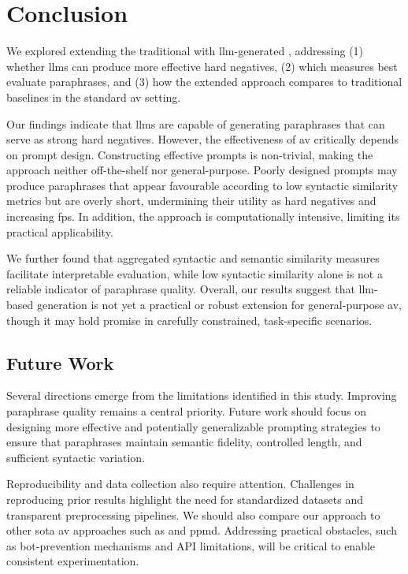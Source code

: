 \chapter{Conclusion}
\label{chap:conclusion}

We explored extending the traditional \impAppr{} with \ac{llm}-generated \imps{}, addressing (1) whether \acp{llm} can produce more effective hard negatives, (2) which measures best evaluate paraphrases, and (3) how the extended approach compares to traditional baselines in the standard \ac{av} setting.

Our findings indicate that \acp{llm} are capable of generating paraphrases that can serve as strong hard negatives. 
However, the effectiveness of \ac{av} critically depends on prompt design. 
Constructing effective prompts is non-trivial, making the approach neither off-the-shelf nor general-purpose. 
Poorly designed prompts may produce paraphrases that appear favourable according to low syntactic similarity metrics but are overly short, undermining their utility as hard negatives and increasing \acp{fp}. 
In addition, the approach is computationally intensive, limiting its practical applicability.  

We further found that aggregated syntactic and semantic similarity measures facilitate interpretable evaluation, while low syntactic similarity alone is not a reliable indicator of paraphrase quality. 
Overall, our results suggest that \ac{llm}-based \imp{} generation is not yet a practical or robust extension for general-purpose \ac{av}, though it may hold promise in carefully constrained, task-specific scenarios.  



\section{Future Work}

Several directions emerge from the limitations identified in this study. 
Improving paraphrase quality remains a central priority. 
Future work should focus on designing more effective and potentially generalizable prompting strategies to ensure that paraphrases maintain semantic fidelity, controlled length, and sufficient syntactic variation.  

Reproducibility and data collection also require attention. 
Challenges in reproducing prior results highlight the need for standardized datasets and transparent preprocessing pipelines. 
We should also compare our approach to other \acl{sota} \ac{av} approaches such as \unmasking{} and \ac{ppmd}.
Addressing practical obstacles, such as bot-prevention mechanisms and API limitations, will be critical to enable consistent experimentation.  

